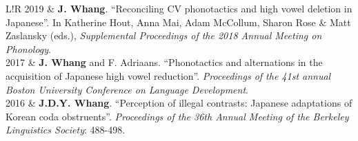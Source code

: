 \documentclass[a4paper,11pt]{article}
\newcommand\VRule{\color{lightgray}\vrule width 0.5pt}
\begin{document}
\begin{longtable}{L!{\VRule}R}
		2019 & \textbf{J. Whang}. ``Reconciling CV phonotactics and high vowel deletion in Japanese''. In Katherine Hout, Anna Mai, Adam McCollum, Sharon Rose \& Matt Zaslansky (eds.), \emph{Supplemental Proceedings of the 2018 Annual Meeting on Phonology}.\\
		
		2017 & \textbf{J. Whang} and F. Adriaans. ``Phonotactics and alternations in the acquisition of Japanese high vowel reduction''. \emph{Proceedings of the 41st annual Boston University Conference on Language Development}.\\

		2016 & \textbf{J.D.Y. Whang}. ``Perception of illegal contrasts: Japanese adaptations of Korean coda obstruents''. \emph{Proceedings of the 36th Annual Meeting of the Berkeley Linguistics Society}: 488-498.\\

		
				
		
					\end{longtable}
	
\end{document}
